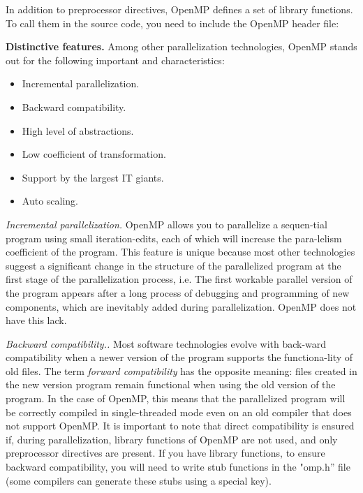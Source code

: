 {\begin{table}[H]
	\end{table}
	\par In addition to preprocessor directives, OpenMP defines a set of library functions. To call them in the source code, you need to include the OpenMP header file:
	\begin{figure}[H]
		
	\end{figure}
	\par\textbf{Distinctive features.} Among other parallelization technologies, OpenMP stands out for the following important and characteristics:
	\begin{itemize}
		\item Incremental parallelization.
		\item Backward compatibility.
		\item High level of abstractions.
		\item Low coefficient of transformation.
		\item Support by the largest IT giants.
		\item Auto scaling.
	\end{itemize}
	\par\textit{Incremental parallelization.} OpenMP allows you to parallelize a sequen-tial program using small iteration-edits, each of which will increase the para-lelism coefficient of the program. This feature is unique because most other technologies suggest a significant change in the structure of the parallelized program at the first stage of the parallelization process, i.e. The first workable parallel version of the program appears after a long process of debugging and programming of new components, which are inevitably added during parallelization. OpenMP does not have this lack.
	\par\textit{Backward compatibility..} Most software technologies evolve with back-ward compatibility when a newer version of the program supports the functiona-lity of old files. The term \textit{forward compatibility} has the opposite meaning: files created in the new version program remain functional when using the old version of the program. In the case of OpenMP, this means that the parallelized program will be correctly compiled in single-threaded mode even on an old compiler that does not support OpenMP. It is important to note that direct compatibility is ensured if, during parallelization, library functions of OpenMP are not used, and only preprocessor directives are present. If you have library functions, to ensure backward compatibility, you will need to write stub functions in the "omp.h'' file (some compilers can generate these stubs using a special key).
}
